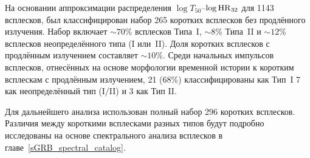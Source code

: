 На основании аппроксимации распределения $\log T_{50}$--$\log {\mathrm{HR}}_{32}$ 
для 1143 всплесков, был классифицирован набор 265 коротких всплесков без продлённого излучения. 
Набор включает $\sim 70$\% всплесков Типа~I, $\sim 8$\% Типа~II и $\sim 12$\%
всплесков неопределённого типа (I или~II). Доля коротких всплесков с продлённым 
излучением составляет $\sim 10$\%.
Среди начальных импульсов всплесков, отнесённых на основе морфологии временной 
истории к коротким всплескам с продлённым излучением, 21 (68\%) классифицированы как Тип~I 
7 как неопределённый тип (I/II) и 3 как Тип II.

Для дальнейшего анализа использован полный набор 296 коротких всплесков. 
Различия между короткими всплесками разных типов будут подробно исследованы на
основе спектрального анализа всплесков в главе~\ref{sGRB_spectral_catalog}.

\clearpage